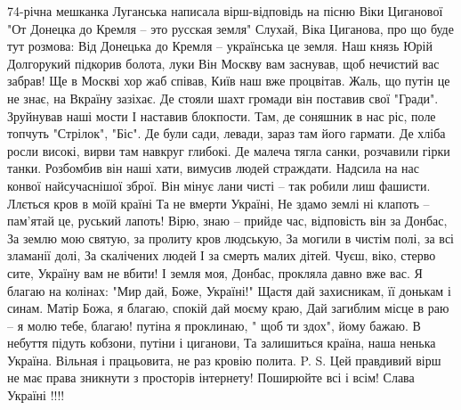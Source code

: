  
 
 
 
 


74-річна мешканка Луганська написала вірш-відповідь на пісню Віки Циганової "От Донецка до Кремля – это русская земля"
Слухай, Віка Циганова,
про що буде тут розмова:
Від Донецька до Кремля –
українська це земля.
Наш князь Юрій Долгорукий
підкорив болота, луки
Він Москву вам заснував,
щоб нечистий вас забрав!
Ще в Москві хор жаб співав,
Київ наш вже процвітав.
Жаль, що путін це не знає,
на Вкраїну зазіхає.
Де стояли шахт громади
він поставив свої "Гради".
Зруйнував наші мости
І наставив блокпости.
Там, де соняшник в нас ріс,
поле топчуть "Стрілок", "Біс".
Де були сади, левади,
зараз там його гармати.
Де хліба росли високі,
вирви там навкруг глибокі.
Де малеча тягла санки,
розчавили гірки танки.
Розбомбив він наші хати,
вимусив людей страждати.
Надсила на нас конвої
найсучаснішої зброї.
Він мінує лани чисті –
так робили лиш фашисти.
Ллється кров в моїй країні
Та не вмерти Україні,
Не здамо землі ні клапоть –
пам’ятай це, руський лапоть!
Вірю, знаю – прийде час,
відповість він за Донбас,
За землю мою святую,
за пролиту кров людськую,
За могили в чистім полі,
за всі зламанії долі,
За скалічених людей
І за смерть малих дітей.
Чуєш, віко, стерво сите,
Україну вам не вбити!
І земля моя, Донбас,
прокляла давно вже вас.
Я благаю на колінах:
"Мир дай, Боже, Україні!"
Щастя дай захисникам,
її донькам і синам.
Матір Божа, я благаю,
спокій дай моєму краю,
Дай загиблим місце в раю –
я молю тебе, благаю!
путіна я проклинаю,
" щоб ти здох", йому бажаю.
В небуття підуть кобзони,
путіни і циганови,
Та залишиться країна,
наша ненька Україна.
Вільная і працьовита,
не раз кровію полита.
P. S. Цей правдивий вірш не має права зникнути з просторів інтернету! Поширюйте всі і всім! Слава Україні !!!!

